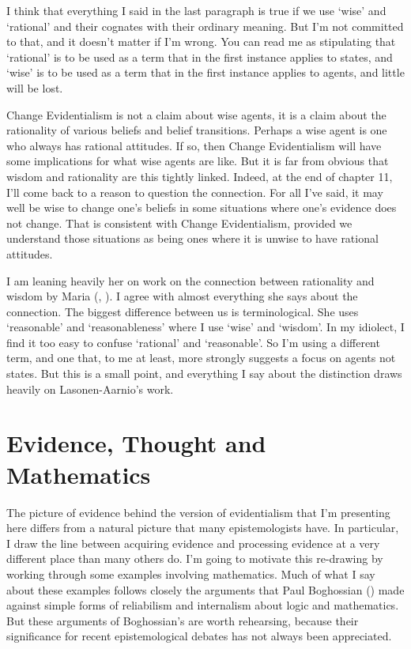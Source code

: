 \documentclass[
  10pt,
  letterpaper,
  twoside]{scrbook}
\begin{document}
I think that everything I said in the last paragraph is true if we use
`wise' and `rational' and their cognates with their ordinary meaning.
But I'm not committed to that, and it doesn't matter if I'm wrong. You
can read me as stipulating that `rational' is to be used as a term that
in the first instance applies to states, and `wise' is to be used as a
term that in the first instance applies to agents, and little will be
lost.

Change Evidentialism is not a claim about wise agents, it is a claim
about the rationality of various beliefs and belief transitions. Perhaps
a wise agent is one who always has rational attitudes. If so, then
Change Evidentialism will have some implications for what wise agents
are like. But it is far from obvious that wisdom and rationality are
this tightly linked. Indeed, at the end of chapter 11, I'll come back to
a reason to question the connection. For all I've said, it may well be
wise to change one's beliefs in some situations where one's evidence
does not change. That is consistent with Change Evidentialism, provided
we understand those situations as being ones where it is unwise to have
rational attitudes.

I am leaning heavily her on work on the connection between rationality
and wisdom by Maria (, ). I agree with almost
everything she says about the connection. The biggest difference between
us is terminological. She uses `reasonable' and `reasonableness' where I
use `wise' and `wisdom'. In my idiolect, I find it too easy to confuse
`rational' and `reasonable'. So I'm using a different term, and one
that, to me at least, more strongly suggests a focus on agents not
states. But this is a small point, and everything I say about the
distinction draws heavily on Lasonen-Aarnio's work.

\section{Evidence, Thought and
Mathematics}\label{evidencethoughtandmathematics}

The picture of evidence behind the version of evidentialism that I'm
presenting here differs from a natural picture that many epistemologists
have. In particular, I draw the line between acquiring evidence and
processing evidence at a very different place than many others do. I'm
going to motivate this re-drawing by working through some examples
involving mathematics. Much of what I say about these examples follows
closely the arguments that Paul Boghossian
() made against simple forms of
reliabilism and internalism about logic and mathematics. But these
arguments of Boghossian's are worth rehearsing, because their
significance for recent epistemological debates has not always been
appreciated.
\end{document}
